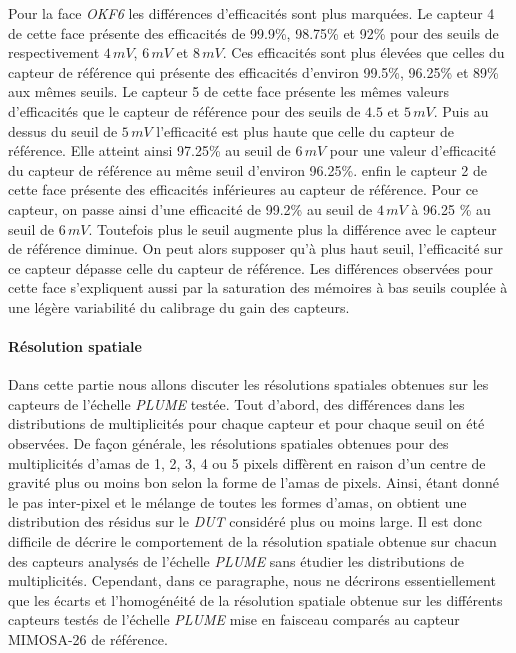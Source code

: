    \medskip
   
   Pour la face \textit{OKF6} les diff\'erences d'efficacit\'es sont plus marqu\'ees. Le capteur 4 de cette face pr\'esente des efficacit\'es de 99.9\%, 98.75\% et 92\% pour des seuils de respectivement $4 \, mV$, $6 \, mV$ et $8 \, mV$. Ces efficacit\'es sont plus \'elev\'ees que celles du capteur de r\'ef\'erence qui pr\'esente des efficacit\'es d'environ 99.5\%, 96.25\% et 89\% aux m\^emes seuils. Le capteur 5 de cette face pr\'esente les m\^emes valeurs d'efficacit\'es que le capteur de r\'ef\'erence pour des seuils de $4.5$ et $5 \, mV$. Puis au dessus du seuil de $5\, mV$ l'efficacit\'e est plus haute que celle du capteur de r\'ef\'erence. Elle atteint ainsi 97.25\% au seuil de $6 \, mV$ pour une valeur d'efficacit\'e du capteur de r\'ef\'erence au m\^eme seuil d'environ 96.25\%. enfin le capteur 2 de cette face pr\'esente des efficacit\'es inf\'erieures au capteur de r\'ef\'erence. Pour ce capteur, on passe ainsi d'une efficacit\'e de 99.2\% au seuil de $4 \, mV$ \`a 96.25 \% au seuil de $6 \, mV$. Toutefois plus le seuil augmente plus la diff\'erence avec le capteur de r\'ef\'erence diminue. On peut alors supposer qu'à plus haut seuil, l'efficacit\'e sur ce capteur d\'epasse celle du capteur de r\'ef\'erence. Les diff\'erences observ\'ees pour cette face s'expliquent aussi par la saturation des m\'emoires \`a bas seuils coupl\'ee \`a une l\'eg\`ere variabilit\'e du calibrage du gain des capteurs.

   \paragraph{R\'esolution spatiale}
   
   Dans cette partie nous allons discuter les r\'esolutions spatiales obtenues sur les capteurs de l'\'echelle \textit{PLUME} test\'ee. Tout d'abord, des diff\'erences dans les distributions de multiplicit\'es pour chaque capteur et pour chaque seuil on \'et\'e observ\'ees. De fa\c{c}on g\'en\'erale, les r\'esolutions spatiales obtenues pour des multiplicit\'es d'amas de 1, 2, 3, 4 ou 5 pixels diff\`erent en raison d'un centre de gravit\'e plus ou moins bon selon la forme de l'amas de pixels. Ainsi, \'etant donn\'e le pas inter-pixel et le m\'elange de toutes les formes d'amas, on obtient une distribution des r\'esidus sur le \textit{DUT} consid\'er\'e plus ou moins large. Il est donc difficile de d\'ecrire le comportement de la r\'esolution spatiale obtenue sur chacun des capteurs analys\'es de l'\'echelle \textit{PLUME} sans \'etudier les distributions de multiplicit\'es. Cependant, dans ce paragraphe, nous ne d\'ecrirons essentiellement que les \'ecarts et l'homog\'en\'eit\'e de la r\'esolution spatiale obtenue sur les diff\'erents capteurs test\'es de l'\'echelle \textit{PLUME} mise en faisceau compar\'es au capteur MIMOSA-26 de r\'ef\'erence.
   
